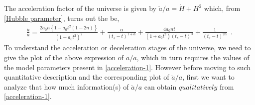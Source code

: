 \documentclass{article}
\begin{document}
The acceleration factor of the universe is given by $\ddot{a}/a = \dot{H} + H^2$ which, from \ref{Hubble parameter}, turns out the be,
\begin{eqnarray}
 \frac{\ddot{a}}{a} = \frac{2a_0n\left\{1 - a_0t^2(1 - 2n)\right\}}{\left(1 + a_0t^2\right)^2} 
 + \frac{\alpha}{\left(t_s - t\right)^{1+\alpha}} + \frac{4a_0nt}{\left(1 + a_0t^2\right)\left(t_s - t\right)^{\alpha}} 
 + \frac{1}{\left(t_s - t\right)^{2\alpha}}~~.
 \label{acceleration-1}
\end{eqnarray}
To understand the acceleration or deceleration stages of the universe, we need to give the plot of the above expression of $\ddot{a}/a$, 
which in turn requires the values of the model parameters present in \ref{acceleration-1}. However before moving to such 
quantitative description and the corresponding plot of $\ddot{a}/a$, first we 
want to analyze that how much information(s) of $\ddot{a}/a$ can obtain $qualitatively$ from \ref{acceleration-1}.\\     
\end{document}
